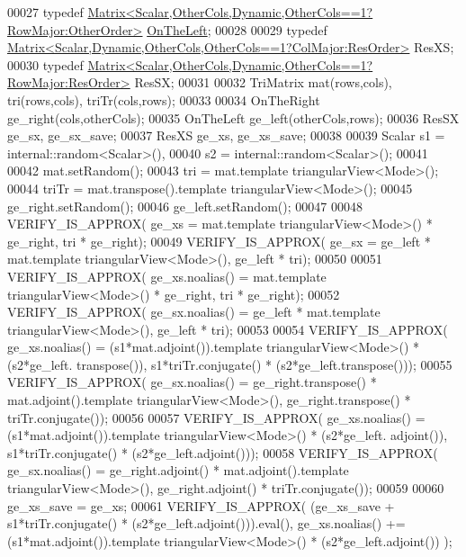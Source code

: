 \begin{DoxyCode}
00027   \textcolor{keyword}{typedef} \hyperlink{group___core___module_class_eigen_1_1_matrix}{Matrix<Scalar,OtherCols,Dynamic,OtherCols==1?RowMajor:OtherOrder>}
       \hyperlink{group__enums_ggac22de43beeac7a78b384f99bed5cee0ba129609b3bdf23b071f5f86cf2f995ec4}{OnTheLeft};
00028   
00029   \textcolor{keyword}{typedef} \hyperlink{group___core___module_class_eigen_1_1_matrix}{Matrix<Scalar,Dynamic,OtherCols,OtherCols==1?ColMajor:ResOrder>}
       ResXS;
00030   \textcolor{keyword}{typedef} \hyperlink{group___core___module_class_eigen_1_1_matrix}{Matrix<Scalar,OtherCols,Dynamic,OtherCols==1?RowMajor:ResOrder>}
       ResSX;
00031 
00032   TriMatrix  mat(rows,cols), tri(rows,cols), triTr(cols,rows);
00033   
00034   OnTheRight  ge\_right(cols,otherCols);
00035   OnTheLeft   ge\_left(otherCols,rows);
00036   ResSX       ge\_sx, ge\_sx\_save;
00037   ResXS       ge\_xs, ge\_xs\_save;
00038 
00039   Scalar s1 = internal::random<Scalar>(),
00040          s2 = internal::random<Scalar>();
00041 
00042   mat.setRandom();
00043   tri = mat.template triangularView<Mode>();
00044   triTr = mat.transpose().template triangularView<Mode>();
00045   ge\_right.setRandom();
00046   ge\_left.setRandom();
00047 
00048   VERIFY\_IS\_APPROX( ge\_xs = mat.template triangularView<Mode>() * ge\_right, tri * ge\_right);
00049   VERIFY\_IS\_APPROX( ge\_sx = ge\_left * mat.template triangularView<Mode>(), ge\_left * tri);
00050   
00051   VERIFY\_IS\_APPROX( ge\_xs.noalias() = mat.template triangularView<Mode>() * ge\_right, tri * ge\_right);
00052   VERIFY\_IS\_APPROX( ge\_sx.noalias() = ge\_left * mat.template triangularView<Mode>(), ge\_left * tri);
00053 
00054   VERIFY\_IS\_APPROX( ge\_xs.noalias() = (s1*mat.adjoint()).\textcolor{keyword}{template} triangularView<Mode>() * (s2*ge\_left.
      transpose()), s1*triTr.conjugate() * (s2*ge\_left.transpose()));
00055   VERIFY\_IS\_APPROX( ge\_sx.noalias() = ge\_right.transpose() * mat.adjoint().template triangularView<Mode>(),
       ge\_right.transpose() * triTr.conjugate());
00056   
00057   VERIFY\_IS\_APPROX( ge\_xs.noalias() = (s1*mat.adjoint()).\textcolor{keyword}{template} triangularView<Mode>() * (s2*ge\_left.
      adjoint()), s1*triTr.conjugate() * (s2*ge\_left.adjoint()));
00058   VERIFY\_IS\_APPROX( ge\_sx.noalias() = ge\_right.adjoint() * mat.adjoint().template triangularView<Mode>(), 
      ge\_right.adjoint() * triTr.conjugate());
00059 
00060   ge\_xs\_save = ge\_xs;
00061   VERIFY\_IS\_APPROX( (ge\_xs\_save + s1*triTr.conjugate() * (s2*ge\_left.adjoint())).eval(), ge\_xs.noalias() +=
       (s1*mat.adjoint()).\textcolor{keyword}{template} triangularView<Mode>() * (s2*ge\_left.adjoint()) );

\end{DoxyCode}
